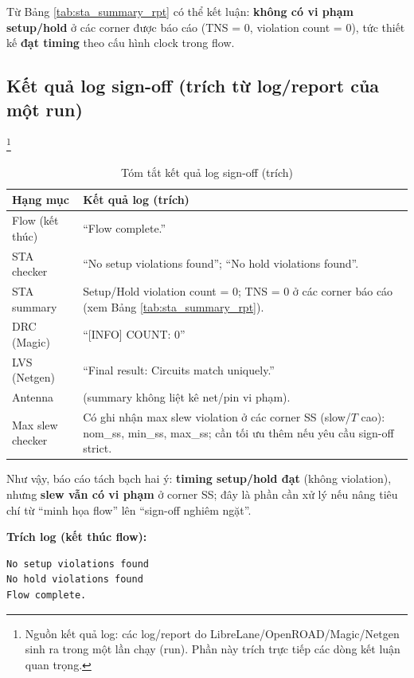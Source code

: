 Từ Bảng \ref{tab:sta_summary_rpt} có thể kết luận: \textbf{không có vi phạm setup/hold} ở các corner được báo cáo (TNS = 0, violation count = 0), tức thiết kế \textbf{đạt timing} theo cấu hình clock trong flow.

\subsection{Kết quả log sign-off (trích từ log/report của một run)}
\footnote{Nguồn kết quả log: các log/report do LibreLane/OpenROAD/Magic/Netgen sinh ra trong một lần chạy (run). Phần này trích trực tiếp các dòng kết luận quan trọng.}

\begin{table}[H]
    \centering
    \caption{Tóm tắt kết quả log sign-off (trích)}
    \label{tab:signoff_log_summary}
    \begin{tabularx}{\textwidth}{|l|X|}
        \hline
        \textbf{Hạng mục} & \textbf{Kết quả log (trích)} \\
        \hline
        Flow (kết thúc) & ``Flow complete.'' \\
        \hline
        STA checker & ``No setup violations found''; ``No hold violations found''. \\
        \hline
        STA summary & Setup/Hold violation count = 0; TNS = 0 ở các corner báo cáo (xem Bảng \ref{tab:sta_summary_rpt}). \\
        \hline
        DRC (Magic) & ``[INFO] COUNT: 0'' \\
        \hline
        LVS (Netgen) & ``Final result: Circuits match uniquely.'' \\
        \hline
        Antenna & (summary không liệt kê net/pin vi phạm). \\
        \hline
        Max slew checker & Có ghi nhận max slew violation ở các corner SS (slow/\(T\) cao): nom\_ss, min\_ss, max\_ss; cần tối ưu thêm nếu yêu cầu sign-off strict. \\
        \hline
    \end{tabularx}
\end{table}

Như vậy, báo cáo tách bạch hai ý: \textbf{timing setup/hold đạt} (không violation), nhưng \textbf{slew vẫn có vi phạm} ở corner SS; đây là phần cần xử lý nếu nâng tiêu chí từ ``minh họa flow'' lên ``sign-off nghiêm ngặt''.

\textbf{Trích log (kết thúc flow):}
\begin{verbatim}
No setup violations found
No hold violations found
Flow complete.
\end{verbatim}

